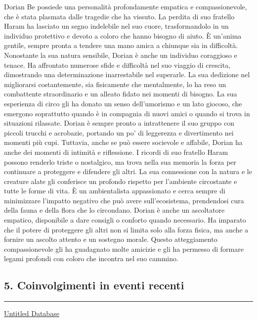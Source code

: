 Dorian Be possiede una personalità profondamente empatica e
compassionevole, che è stata plasmata dalle tragedie che ha vissuto. La
perdita di suo fratello Haram ha lasciato un segno indelebile nel suo
cuore, trasformandolo in un individuo protettivo e devoto a coloro che
hanno bisogno di aiuto. È un'anima gentile, sempre pronta a tendere una
mano amica a chiunque sia in difficoltà. Nonostante la sua natura
sensibile, Dorian è anche un individuo coraggioso e tenace. Ha
affrontato numerose sfide e difficoltà nel suo viaggio di crescita,
dimostrando una determinazione inarrestabile nel superarle. La sua
dedizione nel migliorarsi costantemente, sia fisicamente che
mentalmente, lo ha reso un combattente straordinario e un alleato fidato
nei momenti di bisogno. La sua esperienza di circo gli ha donato un
senso dell'umorismo e un lato giocoso, che emergono soprattutto quando è
in compagnia di nuovi amici o quando si trova in situazioni rilassate.
Dorian è sempre pronto a intrattenere il suo gruppo con piccoli trucchi
e acrobazie, portando un po' di leggerezza e divertimento nei momenti
più cupi. Tuttavia, anche se può essere socievole e affabile, Dorian ha
anche dei momenti di intimità e riflessione. I ricordi di suo fratello
Haram possono renderlo triste o nostalgico, ma trova nella sua memoria
la forza per continuare a proteggere e difendere gli altri. La sua
connessione con la natura e le creature alate gli conferisce un profondo
rispetto per l'ambiente circostante e tutte le forme di vita. È un
ambientalista appassionato e cerca sempre di minimizzare l'impatto
negativo che può avere sull'ecosistema, prendendosi cura della fauna e
della flora che lo circondano. Dorian è anche un ascoltatore empatico,
disponibile a dare consigli o conforto quando necessario. Ha imparato
che il potere di proteggere gli altri non si limita solo alla forza
fisica, ma anche a fornire un ascolto attento e un sostegno morale.
Questo atteggiamento compassionevole gli ha guadagnato molte amicizie e
gli ha permesso di formare legami profondi con coloro che incontra nel
suo cammino.

\subsection{5. Coinvolgimenti in eventi
recenti}\label{coinvolgimenti-in-eventi-recenti}

\begin{center}\rule{0.5\linewidth}{0.5pt}\end{center}

\href{Untitled\%20Database\%20d9b94363331d4223b89fa494a1e7f74e.csv}{Untitled
Database}

